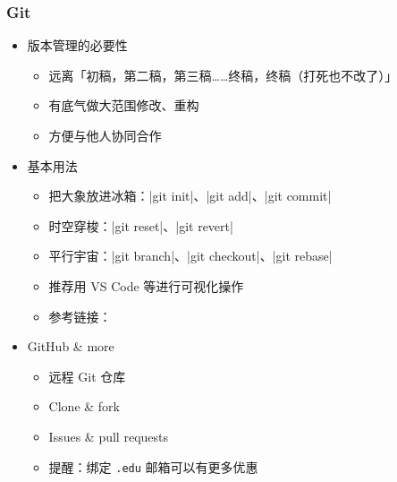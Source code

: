\begin{frame}[fragile]
\frametitle{Git}
\begin{itemize}
  \item<+-> 版本管理的必要性

    \begin{itemize}
      \item 远离「初稿，第二稿，第三稿……终稿，终稿（打死也不改了）」
      \item 有底气做大范围修改、重构
      \item 方便与他人协同合作
    \end{itemize}

  \item<+-> 基本用法

    \begin{itemize}
      \item 把大象放进冰箱：|git init|、|git add|、|git commit|
      \item 时空穿梭：|git reset|、|git revert|
      \item 平行宇宙：|git branch|、|git checkout|、|git rebase|
      \item 推荐用 VS Code 等进行可视化操作
      \item 参考链接：
    \end{itemize}

  \item<+-> GitHub \href{https://github.com}{\faGithub} \& more

    \begin{itemize}
      \item 远程 Git 仓库
      \item Clone \& fork
      \item Issues \& pull requests
      \item<+-> \alert{提醒：绑定 \texttt{.edu} 邮箱可以有更多优惠}
    \end{itemize}
\end{itemize}
\end{frame}